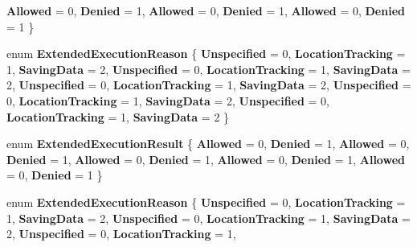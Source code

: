 \begin{DoxyCompactItemize}
{\bfseries Allowed} = 0, 
{\bfseries Denied} = 1, 
{\bfseries Allowed} = 0, 
{\bfseries Denied} = 1, 
\newline
{\bfseries Allowed} = 0, 
{\bfseries Denied} = 1
 \}
\item 
\mbox{\label{namespace_windows_1_1_application_model_1_1_extended_execution_ad0dba54dc24164e0c6d2e0a29d818528}} 
enum {\bfseries Extended\+Execution\+Reason} \{ \newline
{\bfseries Unspecified} = 0, 
{\bfseries Location\+Tracking} = 1, 
{\bfseries Saving\+Data} = 2, 
{\bfseries Unspecified} = 0, 
\newline
{\bfseries Location\+Tracking} = 1, 
{\bfseries Saving\+Data} = 2, 
{\bfseries Unspecified} = 0, 
{\bfseries Location\+Tracking} = 1, 
\newline
{\bfseries Saving\+Data} = 2, 
{\bfseries Unspecified} = 0, 
{\bfseries Location\+Tracking} = 1, 
{\bfseries Saving\+Data} = 2, 
\newline
{\bfseries Unspecified} = 0, 
{\bfseries Location\+Tracking} = 1, 
{\bfseries Saving\+Data} = 2
 \}
\item 
\mbox{\label{namespace_windows_1_1_application_model_1_1_extended_execution_a24027557babcb8bc4950e24a373e5677}} 
enum {\bfseries Extended\+Execution\+Result} \{ \newline
{\bfseries Allowed} = 0, 
{\bfseries Denied} = 1, 
{\bfseries Allowed} = 0, 
{\bfseries Denied} = 1, 
\newline
{\bfseries Allowed} = 0, 
{\bfseries Denied} = 1, 
{\bfseries Allowed} = 0, 
{\bfseries Denied} = 1, 
\newline
{\bfseries Allowed} = 0, 
{\bfseries Denied} = 1
 \}
\item 
\mbox{\label{namespace_windows_1_1_application_model_1_1_extended_execution_ad0dba54dc24164e0c6d2e0a29d818528}} 
enum {\bfseries Extended\+Execution\+Reason} \{ \newline
{\bfseries Unspecified} = 0, 
{\bfseries Location\+Tracking} = 1, 
{\bfseries Saving\+Data} = 2, 
{\bfseries Unspecified} = 0, 
\newline
{\bfseries Location\+Tracking} = 1, 
{\bfseries Saving\+Data} = 2, 
{\bfseries Unspecified} = 0, 
{\bfseries Location\+Tracking} = 1, 

\end{DoxyCompactItemize}
